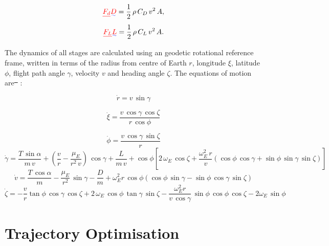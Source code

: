 \documentclass[journal]{new-aiaa}
\providecommand{\DIFadd}[1]{{\protect\color{blue}\uwave{#1}}} %
\providecommand{\DIFdel}[1]{{\protect\color{red}\sout{#1}}}                      %
\providecommand{\DIFaddbegin}{} %
\providecommand{\DIFaddend}{} %
\providecommand{\DIFdelbegin}{} %
\providecommand{\DIFdelend}{} %
\newcommand{\DIFscaledelfig}{0.5}
\newlength{\DIFdelgraphicswidth} %
\newlength{\DIFdelgraphicsheight} %
\newcommand{\DIFaddincludegraphics}[2][]{{\color{blue}\fbox{\DIFOincludegraphics[#1]{#2}}}} %
\newcommand{\DIFdelincludegraphics}[2][]{%
\sbox{\DIFdelgraphicsbox}{\DIFOincludegraphics[#1]{#2}}%
\settoboxwidth{\DIFdelgraphicswidth}{\DIFdelgraphicsbox} %
\settoboxtotalheight{\DIFdelgraphicsheight}{\DIFdelgraphicsbox} %
\scalebox{\DIFscaledelfig}{%
\parbox[b]{\DIFdelgraphicswidth}{\usebox{\DIFdelgraphicsbox}\\[-\baselineskip] \rule{\DIFdelgraphicswidth}{0em}}\llap{\resizebox{\DIFdelgraphicswidth}{\DIFdelgraphicsheight}{%
\setlength{\unitlength}{\DIFdelgraphicswidth}%
\begin{picture}(1,1)%
\thicklines\linethickness{2pt} %
{\color[rgb]{1,0,0}\put(0,0){\framebox(1,1){}}}%
{\color[rgb]{1,0,0}\put(0,0){\line( 1,1){1}}}%
{\color[rgb]{1,0,0}\put(0,1){\line(1,-1){1}}}%
\end{picture}%
}\hspace*{3pt}}} %
} %
\DeclareRobustCommand{\DIFaddbegin}{\DIFOaddbegin \let\includegraphics\DIFaddincludegraphics} %
\DeclareRobustCommand{\DIFaddend}{\DIFOaddend \let\includegraphics\DIFOincludegraphics} %
\DeclareRobustCommand{\DIFdelbegin}{\DIFOdelbegin \let\includegraphics\DIFdelincludegraphics} %
\DeclareRobustCommand{\DIFdelend}{\DIFOaddend \let\includegraphics\DIFOincludegraphics} %
\begin{document}
\begin{equation}
\DIFdelbegin \DIFdel{F_d }\DIFdelend \DIFaddbegin \DIFadd{\textcolor{red}{D} }\DIFaddend = \frac{1}{2} \, \rho \, C_D \, v^2 \, A ,
\end{equation}
\begin{equation}
\DIFdelbegin \DIFdel{F_L }\DIFdelend \DIFaddbegin \DIFadd{\textcolor{red}{L} }\DIFaddend = \frac{1}{2} \, \rho \, C_L \, v^2 \, A .
\end{equation}

The dynamics of all stages are calculated using an geodetic rotational reference frame, written in terms of the radius from centre of Earth $r$, longitude $\xi$, latitude $\phi$, flight path angle $\gamma$, velocity $v$ and heading angle $\zeta$. The equations of motion are\DIFdelbegin \DIFdel{\mbox{%
\cite{Josselyn2002a}}%
}\DIFdelend \DIFaddbegin \DIFadd{\mbox{%
\cite{Josselyn2002}}%
}\DIFaddend :

\begin{equation}
\dot{r} = v \, \sin \gamma
\end{equation}

\begin{equation}
\dot{\xi} = \frac{v \, \cos \gamma \, \cos \zeta}{r \, \cos \phi}
\end{equation}

\begin{equation}
\dot{\phi} = \frac{v\,\cos\gamma\,\sin\zeta}{r}
\end{equation}
\begin{equation}
\dot{\gamma} = \frac{T\,\sin\alpha}{m\,v}+ (\frac{v}{r}-\frac{\mu_E}{r^2 \,v})\,\cos\gamma + \frac{L}{m\,v}
 + \cos\phi[2\,\omega_E\, \cos\zeta + \frac{\omega_E^2\, r}{v}(\cos\phi\,\cos\gamma+\sin\phi\,\sin\gamma\,\sin\zeta)]
 \end{equation}
\begin{equation}
\dot{v} = \frac{T\,\cos\alpha}{m}-\frac{\mu_E}{r^2}\,\sin\gamma - \frac{D}{m}
+ \omega_E^2 r\,\cos\phi(\cos\phi\,\sin\gamma-\sin\phi\,\cos\gamma\,\sin\zeta)
\end{equation}
\begin{equation}
\dot{\zeta} = -\frac{v}{r}\tan\phi\,\cos\gamma\,\cos\zeta +2\,\omega_E\,\cos\phi\,\tan\gamma\,\sin\zeta - \frac{\omega_E^2 r}{v\,\cos\gamma}\,\sin\phi \, \cos\phi\,\cos\zeta-2\omega_E\,\sin\phi 
\end{equation}


\section{Trajectory Optimisation} \label{section:optimisation}
\end{document}
